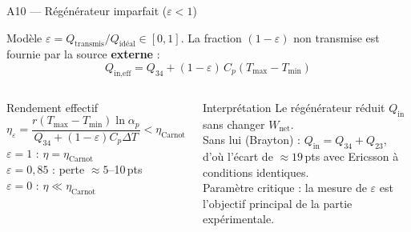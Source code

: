 \documentclass[aspectratio=43, 10pt]{beamer}
\newcommand{\Tmin}{T_{\min}}
\newcommand{\Tmax}{T_{\max}}
\newcommand{\rp}{\alpha_p}
\newcommand{\etaC}{\eta_{\text{Carnot}}}
\newcommand{\Wnet}{W_{\text{net}}}
\newcommand{\Qin}{Q_{\text{in}}}
\begin{document}
\begin{frame}{A10 --- R\'eg\'en\'erateur imparfait ($\varepsilon < 1$)}

  \begin{block}{Mod\`ele}
    \small
    $\varepsilon = Q_{\text{transmis}}/Q_{\text{id\'eal}} \in [0,1]$.
    La fraction $(1-\varepsilon)$ non transmise est fournie
    par la source \textbf{externe} :
    \[
      Q_{\text{in,eff}}
      = Q_{34} + (1-\varepsilon)\,C_p(\Tmax-\Tmin)
    \]
  \end{block}

  \begin{columns}[T,onlytextwidth]
      \begin{alertblock}{Rendement effectif}
        \[
          \eta_\varepsilon
          = \frac{r(\Tmax-\Tmin)\ln\rp}
                 {Q_{34} + (1-\varepsilon)C_p\Delta T}
          < \etaC
        \]
        \small
        $\varepsilon = 1$ : $\eta = \etaC$\\
        $\varepsilon = 0{,}85$ : perte $\approx 5$--10\,pts\\
        $\varepsilon = 0$ : $\eta \ll \etaC$
      \end{alertblock}

      \begin{exampleblock}{Interpr\'etation}
        \small
        Le r\'eg\'en\'erateur r\'eduit $\Qin$ sans
        changer $\Wnet$.\\[3pt]
        Sans lui (Brayton) :
        $Q_{\text{in}} = Q_{34} + Q_{23}$,
        d'o\`u l'\'ecart de $\approx 19$\,pts avec
        Ericsson \`a conditions identiques.\\[3pt]
        Param\`etre critique : la mesure de $\varepsilon$
        est l'objectif principal de la partie exp\'erimentale.
      \end{exampleblock}
  \end{columns}

\end{frame}
\end{document}
